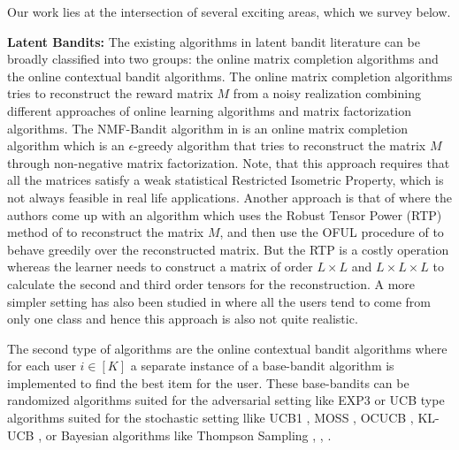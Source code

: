 Our work lies at the intersection of several exciting areas, which we survey below.

\textbf{Latent Bandits:} The existing algorithms in latent bandit literature can be broadly classified into two groups: the online matrix completion algorithms and the online contextual bandit  algorithms. The online matrix completion algorithms tries to reconstruct the reward matrix $M$ from a noisy realization combining different approaches of online learning algorithms and matrix factorization algorithms. The NMF-Bandit algorithm in \citet{sen2016contextual} is an online matrix completion algorithm which is an $\epsilon$-greedy algorithm that tries to reconstruct the matrix $M$ through non-negative matrix factorization. Note, that this approach requires that all the matrices satisfy a weak statistical Restricted Isometric Property, which is not always feasible in real life applications. Another approach is that of \citet{gopalan2016low} where the authors come up with an algorithm which uses the Robust Tensor Power (RTP) method of \citet{anandkumar2014tensor} to reconstruct the matrix $M$, and then use the OFUL procedure of \citet{abbasi2011improved} to behave greedily over the reconstructed matrix. But the RTP is a costly operation whereas the learner needs to construct a matrix of order $L\times L$ and $L\times L \times L$ to calculate the second and third order tensors for the reconstruction.  A more simpler setting has also been studied in \citet{maillard2014latent} where all the users tend to come from only one class and hence this approach is also not quite realistic. 

	The second type of algorithms are the online contextual bandit algorithms where for each user $i\in[K]$ a separate instance of a base-bandit algorithm is implemented to find the best item for the user. These base-bandits can be randomized algorithms suited for the adversarial setting like EXP3 \citep{auer2002nonstochastic} or UCB type algorithms suited for the stochastic setting llike UCB1 \citep{auer2002finite}, MOSS \citep{audibert2009minimax}, OCUCB \citep{lattimore2015optimally}, KL-UCB \citep{cappe2013kullback}, \citep{garivier2011kl} or Bayesian algorithms like Thompson Sampling \citep{thompson1933likelihood}, \citep{thompson1935theory}, \citep{agrawal2012analysis}.


